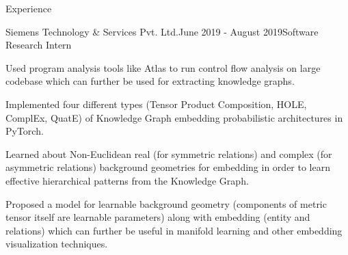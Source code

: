 \documentclass{resume} %
\begin{document}
\begin{rSection}{Experience}
\begin{rSubsection}{Siemens Technology \& Services Pvt. Ltd.}{June 2019 - August 2019}{Software Research Intern}{}
\item Used program analysis tools like Atlas to run control flow analysis on large codebase which can further be used for extracting knowledge graphs.
\item Implemented four different types (Tensor Product Composition, HOLE, ComplEx, QuatE) of Knowledge Graph embedding probabilistic architectures in PyTorch.
\item Learned about Non-Euclidean real (for symmetric relations) and complex (for asymmetric relations) background geometries for embedding in order to learn effective hierarchical patterns from the Knowledge Graph.
\item Proposed a model for learnable background geometry (components of metric tensor itself are learnable parameters) along with embedding (entity and relations) which can further be useful in manifold learning and other embedding visualization techniques. 
\end{rSubsection}

\end{rSection}
\end{document}
